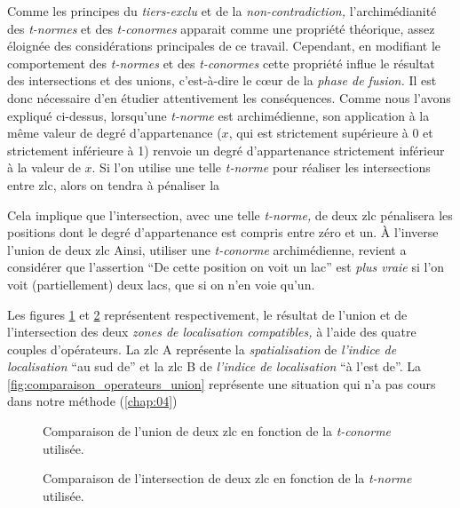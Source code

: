 Comme les principes du \emph{tiers-exclu} et de la
\emph{non-contradiction,} l'archimédianité des \emph{t-normes} et des
\emph{t-conormes} apparait comme une propriété théorique, assez
éloignée des considérations principales de ce travail. Cependant, en
modifiant le comportement des \emph{t-normes} et des \emph{t-conormes}
cette propriété influe le résultat des intersections et des unions,
c'est-à-dire le cœur de la \emph{phase de fusion.} Il est donc
nécessaire d'en étudier attentivement les conséquences.
%
Comme nous l'avons expliqué ci-dessus,
lorsqu'une \emph{t-norme} est archimédienne, son application à la même
valeur de degré d’appartenance (\(x\), qui est strictement supérieure
à 0 et strictement inférieure à 1) renvoie un degré d’appartenance
strictement inférieur à la valeur de \(x\).
%
Si l'on utilise une telle \emph{t-norme} pour réaliser les
intersections entre \ac{zlc}, alors on tendra à pénaliser la


Cela
implique que l'intersection, avec une telle \emph{t-norme,} de deux
\ac{zlc} pénalisera les positions dont le degré d'appartenance est
compris entre zéro et un.
%
À l'inverse l'union de deux \ac{zlc} 
%
Ainsi, utiliser une \emph{t-conorme} archimédienne, revient a
considérer que l'assertion \enquote{De cette position on voit un lac}
est \emph{plus vraie} si l'on voit (partiellement) deux lacs, que si
on n'en voie qu'un.

Les figures \ref{fig:comparaison_operateurs_union} et
\ref{fig:comparaison_operateurs_intersection} représentent
respectivement, le résultat de l'union et de l'intersection des deux
\emph{zones de localisation compatibles,} à l'aide des quatre couples
d'opérateurs.
%
La \ac{zlc} \textcolor{RdBu-9-1}{\textsf{A}} représente
la \emph{spatialisation} de \emph{l'indice de localisation}
\enquote{au sud de} et la \ac{zlc} \textcolor{RdBu-9-9}{\textsf{B}} de
\emph{l'indice de localisation} \enquote{à l'est de}.
%
La \autoref{fig:comparaison_operateurs_union} représente une situation
qui n'a pas cours dans notre méthode (\autoref{chap:04})





\begin{figure}
  \centering
  
  \caption{Comparaison de l'union de deux \ac{zlc} en fonction de la
    \emph{t-conorme} utilisée.}
  \label{fig:comparaison_operateurs_union}
\end{figure}

\begin{figure}
  \centering
  
  \caption{Comparaison de l'intersection de deux \ac{zlc} en fonction
    de la \emph{t-norme} utilisée.}
  \label{fig:comparaison_operateurs_intersection}
\end{figure}

